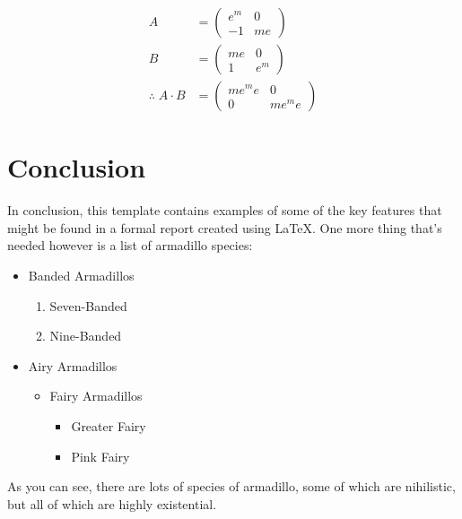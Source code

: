 \documentclass[a4paper, 10pt]{IEEEtran}
\begin{document}
\begin{align}
\label{eq:matrix}
A &=
\begin{pmatrix}
	e^m & 0 \\
	-1 & me^{}
\end{pmatrix} \\[1pt]
B &=
\begin{pmatrix}
	me^{} & 0 \\
	1 & e^m
\end{pmatrix} \\[10pt]
\therefore \; A \cdot B &=
\begin{pmatrix}
	me^{m}e^{} & 0 \\
	0 & me^{m}e^{}
\end{pmatrix}
\end{align}

\vspace{0.5em} %

\section{Conclusion}
\label{sec:conclusion}

In conclusion, this template contains examples of some of the key features that might be found in a formal report created using \LaTeX. One more thing that's needed however is a list of armadillo species:

\begin{itemize} %
\item Banded Armadillos
\begin{enumerate} %
	\item Seven-Banded
	\item Nine-Banded
\end{enumerate}
\item Airy Armadillos
\begin{itemize}
	\item Fairy Armadillos
	\begin{itemize}
		\item Greater Fairy
		\item Pink Fairy
	\end{itemize}
\end{itemize}
\end{itemize}

As you can see, there are lots of species of armadillo, some of which are nihilistic, but all of which are highly existential.
\end{document}
